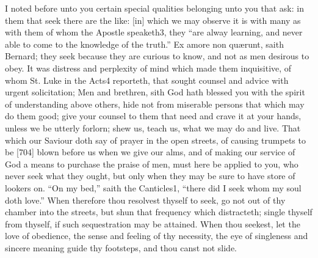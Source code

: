 I noted before unto you certain special qualities belonging unto you that ask: in them that seek there are the like: [in] which we may observe it is with many as with them of whom the Apostle speaketh3, they “are alway learning, and never able to come to the knowledge of the truth.” Ex amore non quærunt, saith Bernard; they seek because they are curious to know, and not as men desirous to obey. It was distress and perplexity of mind which made them inquisitive, of whom St. Luke in the Acts4 reporteth, that sought counsel and advice with urgent solicitation; Men and brethren, sith God hath blessed you with the spirit of understanding above others, hide not from miserable persons that which may do them good; give your counsel to them that need and crave it at your hands, unless we be utterly forlorn; shew us, teach us, what we may do and live. That which our Saviour doth say of prayer in the open streets, of causing trumpets to be [704] blown before us when we give our alms, and of making our service of God a means to purchase the praise of men, must here be applied to you, who never seek what they ought, but only when they may be sure to have store of lookers on. “On my bed,” saith the Canticles1, “there did I seek whom my soul doth love.” When therefore thou resolvest thyself to seek, go not out of thy chamber into the streets, but shun that frequency which distracteth; single thyself from thyself, if such sequestration may be attained. When thou seekest, let the love of obedience, the sense and feeling of thy necessity, the eye of singleness and sincere meaning guide thy footsteps, and thou canst not slide.


